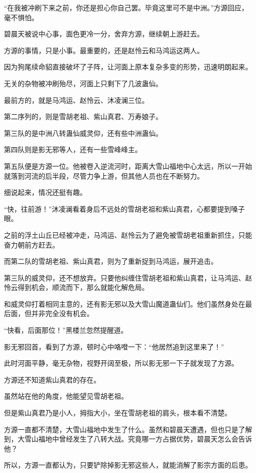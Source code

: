 \begin{this_body}
“在我被冲刷下来之前，你还是担心你自己罢。毕竟这里可不是中洲。”方源回应，毫不惧怕。

碧晨天被说中心事，面色更冷一分，舍弃方源，继续朝上游赶去。

方源的事情，只是小事。最重要的，还是赵怜云和马鸿运这两人。

因为狗尾续命貂直接破坏了子阵，让河面上原本复杂多变的形势，迅速明朗起来。

无关的杂物被冲刷殆尽，河面上只剩下了几波蛊仙。

最前方的，就是马鸿运、赵怜云、沐凌澜三位。

第二序列的，则是雪胡老祖、紫山真君、万寿娘子。

第三队的是中洲八转蛊仙威灵仰，还有些中洲蛊仙。

第四队则是影无邪等人，还有一些雪峰峰主。

第五队便是方源一位。他被卷入逆流河时，距离大雪山福地中心太远，所以一开始就落到河流的后半段，尽管力争上游，但其他人员也在不断努力。

细说起来，情况还挺有趣。

“快，往前游！”沐凌澜看着身后不远处的雪胡老祖和紫山真君，心都要提到嗓子眼。

之前的浮土山丘已经被冲走，马鸿运、赵怜云为了避免被雪胡老祖重新抓住，只能奋力朝前方赶去。

而第二队的雪胡老祖、紫山真君，则为了重新捉到马鸿运，展开追击。

第三队的威灵仰，还不想放弃。只要他纠缠住雪胡老祖和紫山真君，让马鸿运、赵怜云得到机会，顺流而下，那么就能化解危局。

和威灵仰打着相同主意的，还有影无邪以及大雪山魔道蛊仙们。他们虽然身处在最后面，但并非完全没有机会。

“快看，后面那位！”黑楼兰忽然提醒道。

影无邪回首，看到了方源，顿时心中咯噔一下：“他居然追到这里来了！”

此时河面平静，毫无杂物，视野开阔至极，所以影无邪一下子就发现了方源。

方源还不知道紫山真君的存在。

虽然站在他的角度，他能望见雪胡老祖。

但是紫山真君乃是小人，拇指大小，坐在雪胡老祖的肩头，根本看不清楚。

方源一直都不清楚，大雪山福地中发生了什么。虽然和碧晨天遭遇，但也只是了解到，大雪山福地中曾经发生了八转大战。究竟哪一方占据优势，碧晨天怎么会告诉他？

所以，方源一直都认为，只要铲除掉影无邪这些人，就能消解了影宗方面的后患。


\end{this_body}
